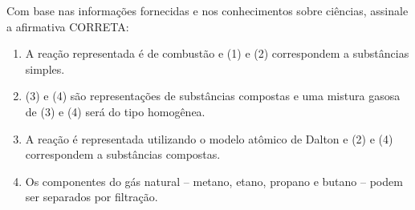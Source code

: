 \par

Com base nas informações fornecidas e nos conhecimentos sobre ciências, assinale a afirmativa CORRETA:\begin{enumerate}
\item A reação representada é de combustão e (1) e (2) correspondem a substâncias simples.
\item (3) e (4) são representações de substâncias compostas e uma mistura gasosa de (3) e (4) será do tipo
      homogênea.
\item A reação é representada utilizando o modelo atômico de Dalton e (2) e (4) correspondem a substâncias
      compostas.
\item Os componentes do gás natural – metano, etano, propano e butano – podem ser separados por filtração.\end{enumerate}
